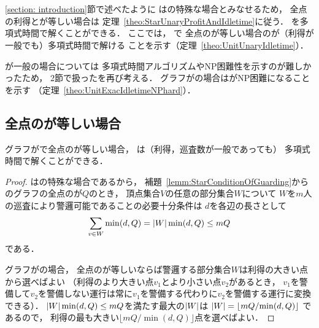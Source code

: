 \section{{\graphUnit}}
\label{section: unit}

\ref{section: introduction}節で述べたように
{\graphUnit}は{\graphStar}の特殊な場合とみなせるため，
全点の利得と{\maxIdletime}が等しい場合は
定理~\ref{theo:StarUnaryProfitAndIdletime}に従う．
{\patProb}を多項式時間で解くことができる．
ここでは，
{\graphUnit}で
全点の{\maxIdletime}が等しい場合の{\patProb}が（利得が一般でも）多項式時間で解ける
ことを示す（定理~\ref{theo:UnitUnaryIdletime}）．

{\maxIdletime}が一般の場合については
多項式時間アルゴリズムやNP困難性を示すのが難しかったため，
2節で扱った{\timeSpecifiedPatProb}を再び考える．
グラフが{\graphUnit}の場合は{\timeSpecifiedPatProb}がNP困難になることを示す
（定理~\ref{theo:UnitExacIdletimeNPhard}）．



\subsection{全点の{\maxIdletime}が等しい場合}

\begin{theo}
  \label{theo:UnitUnaryIdletime}
  グラフが{\graphUnit}で全点の{\maxIdletime}が等しい場合，
  {\patProb}は（利得，巡査数が一般であっても）
  多項式時間で解くことができる．
\end{theo}

\begin{proof}
  {\graphUnit}は{\graphStar}の特殊な場合であるから，
  補題~\ref{lemm:StarConditionOfGuarding}から
  {\graphUnit}のグラフの全点の{\maxIdletime}が$Q$のとき，
  頂点集合$V$の任意の部分集合$W$について
  $W$を$m$人の巡査により警邏可能であることの必要十分条件は
  $d$を各辺の長さとして
  \[
    \sum_{v \in W} \min(d, Q) = \lvert{W}\rvert\min(d, Q) \leq mQ
  \]
  である．

  グラフが{\graphUnit}の場合，
  全点の{\maxIdletime}が等しいならば警邏する部分集合$W$は利得の大きい点から選べばよい
  （利得のより大きい点$v_1$とより小さい点$v_2$があるとき，
  $v_1$を警備して$v_2$を警備しない運行は常に$v_1$を警備する代わりに$v_2$を警備する運行に変換できる）．
  $\lvert{W}\rvert\min(d, Q) \leq mQ$を満たす最大の$\lvert{W}\rvert$は
  $\lvert{W}\rvert = \left\lfloor {mQ}/{\min(d, Q)} \right\rfloor$
  であるので，
  利得の最も大きい$\lfloor {mQ}/{\min(d, Q)} \rfloor$点を選べばよい．
\end{proof}




